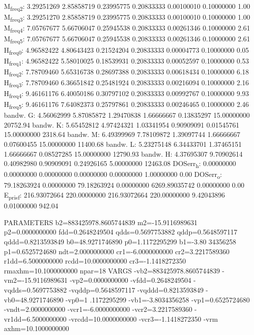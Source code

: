\documentclass[11pt]{article}
\begin{document}
M\textsubscript{freq}\textsubscript{2}:   3.29251269   2.85858719   0.23995775   0.20833333   0.00100010   0.10000000         1.00
M\textsubscript{freq}\textsubscript{3}:   3.29251270   2.85858719   0.23995775   0.20833333   0.00100010   0.10000000         1.00
M\textsubscript{freq}\textsubscript{4}:   7.05767677   5.66706047   0.25945538   0.20833333   0.00261346   0.10000000         2.61
M\textsubscript{freq}\textsubscript{5}:   7.05767677   5.66706047   0.25945538   0.20833333   0.00261346   0.10000000         2.61
H\textsubscript{freq}\textsubscript{0}:   4.96582422   4.80643423   0.21524204   0.20833333   0.00004773   0.10000000         0.05
H\textsubscript{freq}\textsubscript{1}:   4.96582422   5.58010025   0.18539931   0.20833333   0.00052597   0.10000000         0.53
H\textsubscript{freq}\textsubscript{2}:   7.78709460   5.65316738   0.28697388   0.20833333   0.00618434   0.10000000         6.18
H\textsubscript{freq}\textsubscript{3}:   7.78709460   6.36651842   0.25481924   0.20833333   0.00216094   0.10000000         2.16
H\textsubscript{freq}\textsubscript{4}:   9.46161176   6.40050186   0.30797102   0.20833333   0.00992767   0.10000000         9.93
H\textsubscript{freq}\textsubscript{5}:   9.46161176   7.64082373   0.25797861   0.20833333   0.00246465   0.10000000         2.46
bandw. G:   4.56062999   5.87085872   1.29470838   1.66666667   0.13835297  15.00000000     20752.94
bandw. K:   5.65452812   4.97424321   1.03341954   0.90909091   0.01545761  15.00000000      2318.64
bandw. M:   6.49399969   7.78109872   1.39097744   1.66666667   0.07600455  15.00000000     11400.68
bandw. L:   5.23275148   6.34433701   1.37465151   1.66666667   0.08527285  15.00000000     12790.93
bandw. H:   4.37695307   9.70902614   0.40982980   0.90909091   0.24926165   5.00000000     12463.08
DOSerr\textsubscript{h}:   0.00000000   0.00000000   0.00000000   0.00000000   0.00000000   1.00000000         0.00
DOSerr\textsubscript{o}:  79.18263924   0.00000000  79.18263924   0.00000000 6269.89035742   0.00000000         0.00
E\textsubscript{pris}\textsubscript{f}: 216.93072664 220.00000000 216.93072664 220.00000000   9.42043896   0.01000000       942.04


PARAMETERS
  b2=883425978.8605744839 m2=-15.9116989631 p2=0.0000000000 fdd=0.2648249504 qdds=0.5697753882 qddp=0.5648597117 qddd=0.8213593849 b0=48.9271746890 p0=1.1172295299 b1=-3.80
34356258 p1=0.6525724680 ndt=2.0000000000 cr1=-6.0000000000 cr2=3.2217589360 r1dd=6.5000000000 rcdd=10.0000000000 cr3=-1.1418272350 rmaxhm=10.1000000000 npar=18 
VARGS
    -vb2=883425978.8605744839 -vm2=-15.9116989631 -vp2=0.0000000000 -vfdd=0.2648249504 -vqdds=0.5697753882 -vqddp=0.5648597117 -vqddd=0.8213593849 -vb0=48.9271746890 -vp0=1
.1172295299 -vb1=-3.8034356258 -vp1=0.6525724680 -vndt=2.0000000000 -vcr1=-6.0000000000 -vcr2=3.2217589360 -vr1dd=6.5000000000 -vrcdd=10.0000000000 -vcr3=-1.1418272350 -vrm
axhm=10.1000000000 
\end{document}
